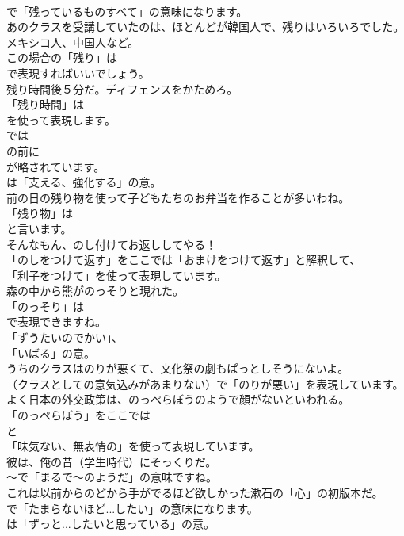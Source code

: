 \documentclass[8pt]{extreport}
\begin{document}
\begin{CJK}{UTF8}{min}
\\	で「残っているものすべて」の意味になります。	
\\	あのクラスを受講していたのは、ほとんどが韓国人で、残りはいろいろでした。メキシコ人、中国人など。 
\\	この場合の「残り」は 
\\	で表現すればいいでしょう。	
\\	残り時間後５分だ。ディフェンスをかためろ。 
\\	「残り時間」は
\\	を使って表現します。
\\	では
\\	の前に
\\	が略されています。
\\	は「支える、強化する」の意。	
\\	前の日の残り物を使って子どもたちのお弁当を作ることが多いわね。 
\\	「残り物」は
\\	と言います。	
\\	そんなもん、のし付けてお返ししてやる！ 
\\	「のしをつけて返す」をここでは「おまけをつけて返す」と解釈して、
\\	「利子をつけて」を使って表現しています。	
\\	森の中から熊がのっそりと現れた。 
\\	「のっそり」は
\\	で表現できますね。
\\	「ずうたいのでかい」、
\\	「いばる」の意。	
\\	うちのクラスはのりが悪くて、文化祭の劇もぱっとしそうにないよ。 
\\	（クラスとしての意気込みがあまりない）で「のりが悪い」を表現しています。	
\\	よく日本の外交政策は、のっぺらぼうのようで顔がないといわれる。 
\\	「のっぺらぼう」をここでは
\\	と
\\	「味気ない、無表情の」を使って表現しています。	
\\	彼は、俺の昔（学生時代）にそっくりだ。 
\\	～で「まるで～のようだ」の意味ですね。	
\\	これは以前からのどから手がでるほど欲しかった漱石の「心」の初版本だ。 
\\	で「たまらないほど...したい」の意味になります。
\\	は「ずっと...したいと思っている」の意。	

\end{CJK}
\end{document}
